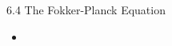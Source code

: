 \begin{frame}{6.4 The Fokker-Planck Equation}
    \begin{itemize}
        \item
    \end{itemize}
\end{frame}
